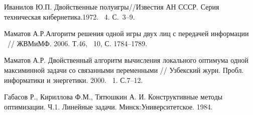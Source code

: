 


%

%

\begin{thebibliography}{9} %

 Иванилов Ю.П. Двойственные полуигры//Известия АН СССР. Серия
техническая кибернетика.1972. \textnumero~4. С.~3--9.

 Маматов А.Р.Алгоритм решения одной игры двух лиц
с передачей информации ~// ЖВМиМФ. 2006. Т.46, \textnumero~10, С. 1784--1789.

 Маматов А.Р. Двойственный алгоритм вычисления локального оптимума
одной максиминной задачи со связанными переменными // Узбекский
журн. Пробл. информатики и энергетики. 2000. \textnumero~1. С.7--12.

 Габасов Р., Кириллова Ф.М., Тятюшкин А. И. Конструктивные
методы оптимизации. Ч.1. Линейные задачи. Минск:Университетское. 1984.



\end{thebibliography}





%


